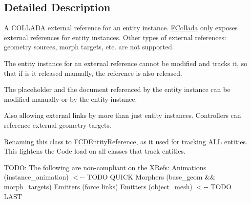 \subsection{Detailed Description}
A COLLADA external reference for an entity instance. \hyperlink{namespaceFCollada}{FCollada} only exposes external references for entity instances. Other types of external references: geometry sources, morph targets, etc. are not supported.

The entity instance for an external reference cannot be modified and tracks it, so that if is it released manually, the reference is also released.

The placeholder and the document referenced by the entity instance can be modified manually or by the entity instance.

Also allowing external links by more than just entity instances. Controllers can reference external geometry targets.

Renaming this class to \hyperlink{classFCDEntityReference}{FCDEntityReference}, as it used for tracking ALL entities. This lightens the Code load on all classes that track entities.

TODO: The following are non-\/compliant on the XRefs: Animations (instance\_\-animation) $<$-\/-\/ TODO QUICK Morphers (base\_\-geom \&\& morph\_\-targets) Emitters (force links) Emitters (object\_\-mesh) $<$-\/-\/ TODO LAST 

